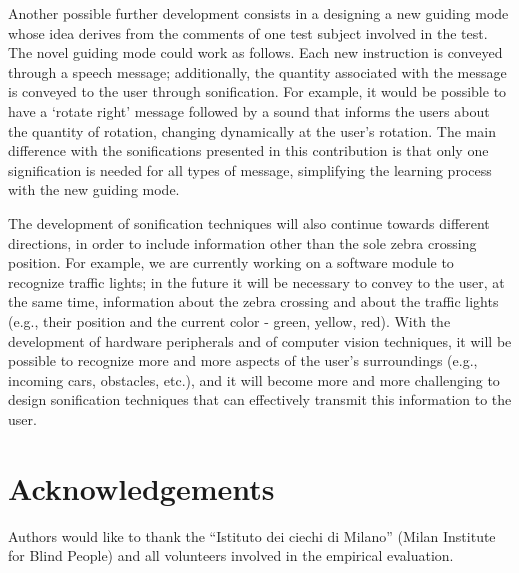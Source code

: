 \documentclass{article}
\begin{document}
Another possible further development consists in a designing a new guiding mode whose idea derives from the comments of one test subject involved in the test. The novel guiding mode could work as follows. Each new instruction is conveyed through a speech message; additionally, the quantity associated with the message is conveyed to the user through sonification. For example, it would be possible to have a `rotate right' message followed by a sound that informs the users about the quantity of rotation, changing dynamically at the user's rotation. The main difference with the sonifications presented in this contribution is that only one signification is needed for all types of message, simplifying the learning process with the new guiding mode.


The development of sonification techniques will also continue towards different directions, in order to include information other than the sole zebra crossing position. For example, we are currently working on a software module to recognize traffic lights; in the future it will be necessary to convey to the user, at the same time, information about the zebra crossing and about the traffic lights (e.g., their position and the current color - green, yellow, red). With the development of hardware peripherals and of computer vision techniques, it will be possible to recognize more and more aspects of the user's surroundings (e.g., incoming cars, obstacles, etc.), and it will become more and more challenging to design sonification techniques that can effectively transmit this information to the user.

\section{Acknowledgements}
Authors would like to thank the ``Istituto dei ciechi di Milano'' (Milan Institute for Blind People) and all volunteers involved in the empirical evaluation.
\end{document}
